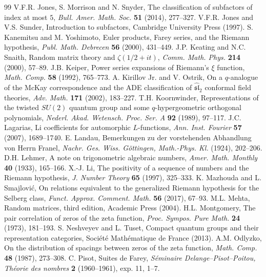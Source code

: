 \documentclass[11pt,a4paper]{article}
\begin{document}
\begin{thebibliography}{99}
 V.F.R. Jones, S. Morrison and N. Snyder, The classification of subfactors of index at most $5$, \textit{Bull. Amer. Math. Soc.} \textbf{51} (2014), 277--327.
 V.F.R. Jones and V.S. Sunder, Introduction to subfactors, Cambridge University Press (1997).
 S. Kanemitsu and M. Yoshimoto, Euler products, Farey series, and the Riemann hypothesis, \textit{Publ. Math. Debrecen} \textbf{56} (2000), 431--449.
 J.P. Keating and N.C. Snaith, Random matrix theory and $\zeta(1/2+it)$, \textit{Comm. Math. Phys.} \textbf{214} (2000), 57--89.
 J.B. Keiper, Power series expansions of Riemann's $\xi$ function, \textit{Math. Comp.} \textbf{58} (1992), 765--773.
 A. Kirillov Jr. and V. Ostrik, On a $q$-analogue of the McKay correspondence and the ADE classification of $\widehat{\mathfrak{sl}}_2$ conformal field theories, \textit{Adv. Math.} \textbf{171} (2002), 183--227.
 T.H. Koornwinder, Representations of the twisted $SU(2)$ quantum group and some $q$-hypergeometric orthogonal polynomials, \textit{Nederl. Akad. Wetensch. Proc. Ser. A} \textbf{92} (1989), 97--117.
 J.C. Lagarias, Li coefficients for automorphic $L$-functions, \textit{Ann. Inst. Fourier} \textbf{57} (2007), 1689--1740.
 E. Landau, Bemerkungen zu der vorstehenden Abhandlung von Herrn Franel, \textit{Nachr. Ges. Wiss. G\"ottingen, Math.-Phys. Kl.} (1924), 202--206.
 D.H. Lehmer, A note on trigonometric algebraic numbers, \textit{Amer. Math. Monthly} \textbf{40} (1933), 165--166.
 X.-J. Li, The positivity of a sequence of numbers and the Riemann hypothesis, \textit{J. Number Theory} \textbf{65} (1997), 325--333.
 K. Mazhouda and L. Smajlovi\'c, On relations equivalent to the generalized Riemann hypothesis for the Selberg class, \textit{Funct. Approx. Comment. Math.} \textbf{56} (2017), 67--93.
 M.L. Mehta, Random matrices, third edition, Academic Press (2004).
 H.L. Montgomery, The pair correlation of zeros of the zeta function, \textit{Proc. Sympos. Pure Math.} \textbf{24} (1973), 181--193.
 S. Neshveyev and L. Tuset, Compact quantum groups and their representation categories, Soci\'et\'e Math\'ematique de France (2013).
 A.M. Odlyzko, On the distribution of spacings between zeros of the zeta function, \textit{Math. Comp.} \textbf{48} (1987), 273--308.
 C. Pisot, Suites de Farey, \textit{S\'eminaire Delange--Pisot--Poitou, Th\'eorie des nombres} \textbf{2} (1960--1961), exp. 11, 1--7.

\end{thebibliography}
\end{document}

